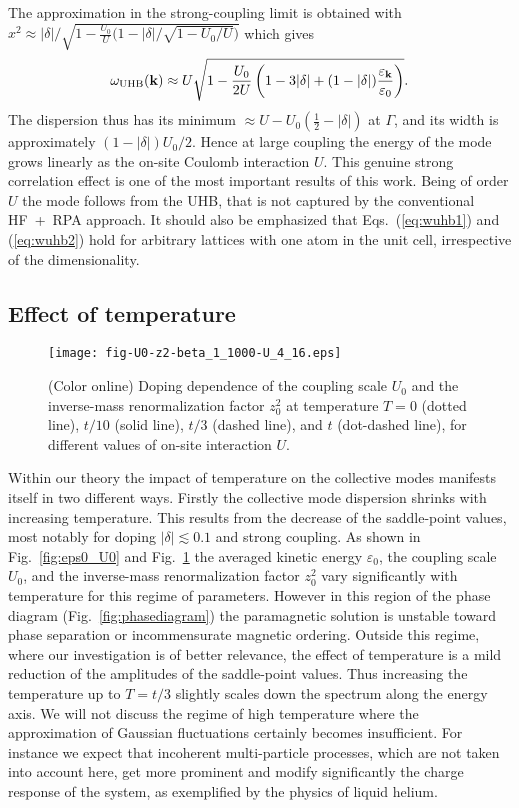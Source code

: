 \documentclass[showpacs,amsmath,twocolumn,floatfix]{revtex4-1}
\begin{document}
The approximation in the strong-coupling limit is obtained with
$x^2 \approx |\delta|/{\sqrt{1- \frac{U_0}{U} \Big( 1- {|\delta|}/{\sqrt{1-U_0/U}} \Big)}}$ 
which gives
\begin{equation}
 \omega_{\rm UHB}({\bf k}) \approx U \sqrt{1 - \frac{U_0}{2U} \left( 1-3|\delta| 
 + (1-|\delta|) \frac{\varepsilon_{\bf k}}{\varepsilon_0}\right)}. 
  \label{eq:wuhb2}
\end{equation}
The dispersion thus has its minimum $\approx U - U_0(\frac{1}{2} - |\delta|)$ at 
$\Gamma$, and its width is approximately $(1-|\delta|) U_0/2$. Hence at large 
coupling the energy of the mode grows linearly as the on-site Coulomb interaction $U$. 
This genuine strong correlation effect is one of the most important results of this 
work. Being of order $U$ the mode follows from the UHB, that is not captured by the 
conventional HF~+~RPA approach. It should also be emphasized that 
Eqs.~(\ref{eq:wuhb1}) and (\ref{eq:wuhb2}) hold for arbitrary lattices with one atom 
in the unit cell, irrespective of the dimensionality. 

\subsection{Effect of temperature}

\begin{figure}[b]
 \texttt{[image: fig-U0-z2-beta\_1\_1000-U\_4\_16.eps]}
  \caption{(Color online) Doping dependence of the coupling scale $U_0$ and the 
  inverse-mass renormalization factor $z_0^2$ at temperature $T=0$ (dotted line), 
  $t/10$ (solid line), $t/3$ (dashed line), and $t$ (dot-dashed line), for different 
  values of on-site interaction $U$.}
  \label{fig:U0}
\end{figure}

Within our theory the impact of temperature on the collective modes manifests itself 
in two different ways.
Firstly the collective mode dispersion shrinks with increasing temperature. This 
results from the decrease of the saddle-point values, most notably for doping 
$|\delta| \lesssim 0.1$ and strong coupling. As shown in Fig.~\ref{fig:eps0_U0} 
and Fig.~\ref{fig:U0} the averaged kinetic energy $\varepsilon_0$, the coupling scale 
$U_0$, and the inverse-mass renormalization factor $z_0^2$ vary significantly with 
temperature for this regime of parameters. However in this region of the phase 
diagram (Fig.~\ref{fig:phasediagram}) the paramagnetic solution is unstable toward 
phase separation or incommensurate magnetic ordering. Outside this regime, where our 
investigation is of better relevance, the effect of temperature is a mild reduction 
of the amplitudes of the saddle-point values. Thus increasing the temperature 
up to $T = t/3$ slightly scales down the spectrum along the energy axis. We 
will not discuss the regime of high temperature where the approximation of Gaussian 
fluctuations certainly becomes insufficient. For instance we expect that incoherent
multi-particle processes, which are not taken into account here, get more 
prominent and modify significantly the charge response of the system, as exemplified 
by the physics of liquid helium.
\end{document}

